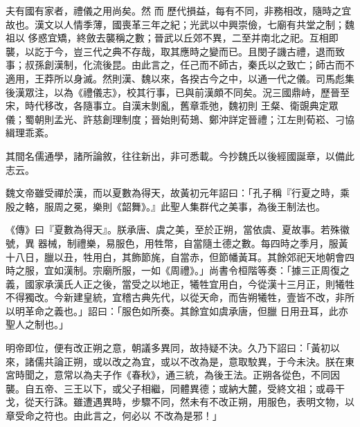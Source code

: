 
\begin{pinyinscope}

 夫有國有家者，禮儀之用尚矣。然
 而
 歷代損益，每有不同，非務相改，隨時之宜故也。漢文以人情季薄，國喪革三年之紀；光武以中興崇儉，七廟有共堂之制；魏祖以
 侈惑宜矯，終斂去襲稱之數；晉武以丘郊不異，二至并南北之祀。互相即襲，以訖于今，豈三代之典不存哉，取其應時之變而已。且閔子譏古禮，退而致事；叔孫創漢制，化流後昆。由此言之，任己而不師古，秦氏以之致亡；師古而不適用，王莽所以身滅。然則漢、魏以來，各揆古今之中，以通一代之儀。司馬彪集後漢眾注，以為《禮儀志》，校其行事，已與前漢頗不同矣。況三國鼎峙，歷晉至宋，時代移改，各隨事立。自漢末剝亂，舊章乖弛，魏初則
 王粲、衛覬典定眾儀；蜀朝則孟光、許慈創理制度；晉始則荀鳷、鄭沖詳定晉禮；江左則荀崧、刁協緝理乖紊。



 其間名儒通學，諸所論敘，往往新出，非可悉載。今抄魏氏以後經國誕章，以備此志云。



 魏文帝雖受禪於漢，而以夏數為得天，故黃初元年詔曰：「孔子稱『行夏之時，乘殷之輅，服周之冕，樂則《韶舞》。』此聖人集群代之美事，為後王制法也。



 《傳》曰『夏數為得天』。朕承唐、虞之美，至於正朔，當依虞、夏故事。若殊徽號，異
 器械，制禮樂，易服色，用牲幣，自當隨土德之數。每四時之季月，服黃十八日，臘以丑，牲用白，其飾節旄，自當赤，但節幡黃耳。其餘郊祀天地朝會四時之服，宜如漢制。宗廟所服，一如《周禮》。」尚書令桓階等奏：「據三正周復之義，國家承漢氏人正之後，當受之以地正，犧牲宜用白，今從漢十三月正，則犧牲不得獨改。今新建皇統，宜稽古典先代，以從天命，而告朔犧牲，壹皆不改，非所以明革命之義也。」詔曰：「服色如所奏。其餘宜如虞承唐，但臘
 日用丑耳，此亦聖人之制也。」



 明帝即位，便有改正朔之意，朝議多異同，故持疑不決。久乃下詔曰：「黃初以來，諸儒共論正朔，或以改之為宜，或以不改為是，意取駮異，于今未決。朕在東宮時聞之，意常以為夫子作《春秋》，通三統，為後王法。正朔各從色，不同因襲。自五帝、三王以下，或父子相繼，同體異德；或納大麓，受終文祖；或尋干戈，從天行誅。雖遭遇異時，步驟不同，然未有不改正朔，用服色，表明文物，以章受命之符也。由此言之，何必以
 不改為是邪！」




\end{pinyinscope}
